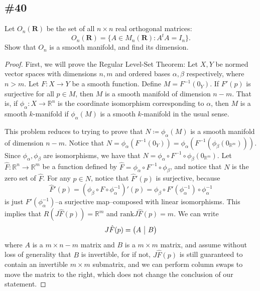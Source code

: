 \documentclass{article}
\newcommand{\R}{\mathbf{R}}
\newcommand{\rank}{\mathrm{rank}}
\theoremstyle{plain} %
\numberwithin{thm}{section} %
\theoremstyle{definition}
\begin{document}
        \subsection{\#40}
        Let $O_n(\R)$ be the set of all $n\times n$ real orthogonal matrices:
        \[ O_n(\R) = \{A\in M_n(\R) : A^tA=I_n\}. \]
        Show that $O_n$ is a smooth manifold, and find its dimension.
        \begin{proof}
            First, we will prove the Regular Level-Set Theorem:
            \smallbreak
            Let \(X,Y\) be normed vector spaces with dimensions \(n,m\) and ordered bases \(\alpha ,\beta\) respectively, where \(n > m\). Let \(F: X \to Y\) be a smooth function. Define \(M = F^{-1} (0_Y)\). If \(F'(p)\) is surjective for all \(p \in M\), then \(M\) is a smooth manifold of dimension \(n - m\). That is, if \(\phi _\alpha : X \to \mathbb{R}^n\) is the coordinate isomorphism corresponding to \(\alpha\), then \(M\) is a smooth \(k\)-manifold if \(\phi _\alpha (M)\) is a smooth \(k\)-manifold in the usual sense.
            \smallbreak
    
            This problem reduces to trying to prove that \(N \coloneqq \phi _\alpha (M)\) is a smooth manifold of dimension \(n-m\). Notice that \(N = \phi _\alpha (F^{-1} (0_Y)) = \phi _\alpha (F^{-1} (\phi _\beta (0_{\mathbb{R}^m})))\). Since \(\phi _\alpha , \phi _\beta\) are isomorphisms, we have that \(N = \phi _\alpha \circ F^{-1} \circ \phi _\beta (0_{\mathbb{R}^m})\). Let \(\hat{F} : \mathbb{R}^n \to \mathbb{R}^m\) be a function defined by \(\hat{F} = \phi _\alpha \circ F^{-1} \circ \phi _\beta\), and notice that \(N\) is the zero set of \(\hat{F}\). For any \(p \in N\), notice that \(\hat{F}'(p)\) is surjective, because
            \[
                \hat{F}'(p) = (\phi _\beta \circ F \circ \phi^{-1} _\alpha)'(p) = \phi _\beta \circ F'(\phi ^{-1}_{\alpha}) \circ \phi^{-1}_{\alpha} 
            \]
            is just \(F'(\phi^{-1}_{\alpha})\)--a surjective map--composed with linear isomorphisms. This implies that \(R(J\hat{F}(p)) = \mathbb{R}^m\) and \(\rank  J\hat{F}(p) = m\). We can write
            \[
                J\hat{F}(p) = \left( \begin{array}{@{}c|c@{}}
                    A & B
                \end{array} \right) 
            \]
            where \(A\) is a \(m\times n-m\) matrix and \(B\) is a \(m \times m\) matrix, and assume without loss of generality that \(B\) is invertible, for if not, \(J\hat{F}(p)\) is still guaranteed to contain an invertible \(m\times m\) submatrix, and we can perform column swaps to move the matrix to the right, which does not change the conclusion of our statement.
    

\end{proof}
\end{document}
